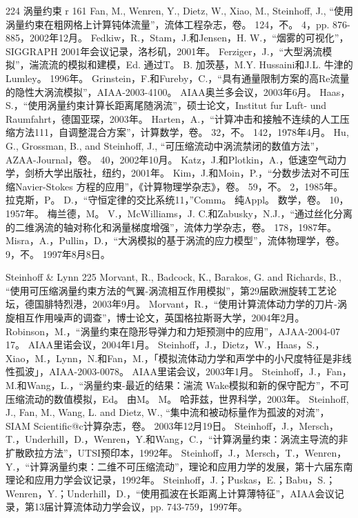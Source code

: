 \documentclass[UTF8,11pt,a4paper,openany,fontset=fandol]{ctexbook}
\begin{document}
224 涡量约束 r 161 Fan, M., Wenren, Y., Dietz, W., Xiao, M., Steinhoff, J., “使用涡量约束在粗网格上计算钝体流量”，流体工程杂志，卷。 124，不。 4，pp. 876-885，2002年12月。 Fedkiw，R.，Stam，J.和Jensen，H. W.，“烟雾的可视化”，SIGGRAPH 2001年会议记录，洛杉矶，2001年。 Ferziger，J.，“大型涡流模拟”，湍流流的模拟和建模，Ed. 通过T。 B. 加茨基，M.Y. Hussaini和J.L. 牛津的Lumley。 1996年。 Grinstein，F.和Fureby，C.，“具有通量限制方案的高Re流量的隐性大涡流模拟”，AIAA-2003-4100。 AIAA奥兰多会议，2003年6月。 Haas，S.，“使用涡量约束计算长距离尾随涡流”，硕士论文，Institut fur Luft- und Raumfahrt，德国亚琛，2003年。 Harten，A.，“计算冲击和接触不连续的人工压缩方法111，自调整混合方案”，计算数学，卷。 32，不。 142，1978年4月。 Hu, G., Grossman, B., and Steinhoff, J., “可压缩流动中涡流禁闭的数值方法”，AZAA-Journal，卷。 40，2002年10月。 Katz，J.和Plotkin，A.，低速空气动力学，剑桥大学出版社，纽约，2001年。 Kim，J.和Moin，P.，“分数步法对不可压缩Navier-Stokes 方程的应用”，《计算物理学杂志》，卷。 59，不。 2，1985年。 拉克斯，P。 D.，“守恒定律的交比系统11，”Comm。 纯Appl。 数学，卷。 10，1957年。 梅兰德，M。 V.，McWilliams，J. C.和Zabusky，N.J.，“通过丝化分离的二维涡流的轴对称化和涡量梯度增强”，流体力学杂志，卷。 178，1987年。 Misra，A.，Pullin，D.，“大涡模拟的基于涡流的应力模型”，流体物理学，卷。 9，不。 1997年8月8日。

Steinhoff \& Lynn 225 Morvant, R., Badcock, K., Barakos, G. and Richards, B., “使用可压缩涡量约束方法的气翼-涡流相互作用模拟”，第29届欧洲旋转工艺论坛，德国腓特烈港，2003年9月。 Morvant，R.，“使用计算流体动力学的刀片-涡旋相互作用噪声的调查”，博士论文，英国格拉斯哥大学，2004年2月。 Robinson，M.，“涡量约束在隐形导弹力和力矩预测中的应用”，AJAA-2004-07 17。 AIAA里诺会议，2004年1月。 Steinhoff，J.，Dietz，W.，Haas，S.，Xiao，M.，Lynn，N.和Fan，M.，「模拟流体动力学和声学中的小尺度特征是非线性孤波」，AIAA-2003-0078。 AIAA里诺会议，2003年1月。 Steinhoff，J.，Fan，M.和Wang，L.，“涡量约束-最近的结果：湍流 Wake模拟和新的保守配方”，不可压缩流动的数值模拟，Ed。 由M。 M。 哈菲兹，世界科学，2003年。 Steinhoff, J., Fan, M., Wang, L. and Dietz, W., “集中流和被动标量作为孤波的对流”，SIAM Scientific@c计算杂志，卷。 2003年12月19日。 Steinhoff，J.，Mersch，T.，Underhill，D.，Wenren，Y.和Wang，C.，“计算涡量约束：涡流主导流的非扩散欧拉方法”，UTSI预印本，1992年。 Steinhoff，J.，Mersch，T.，Wenren，Y.，“计算涡量约束：二维不可压缩流动”，理论和应用力学的发展，第十六届东南理论和应用力学会议记录，1992年。 Steinhoff，J.；Puskas，E.；Babu，S.；Wenren，Y.；Underhill，D.，“使用孤波在长距离上计算薄特征”，AIAA会议记录，第13届计算流体动力学会议，pp. 743-759，1997年。
\end{document}
